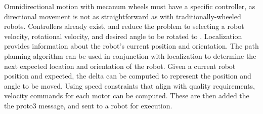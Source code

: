 Omnidirectional motion with mecanum wheels must have a specific controller, as directional movement is not as straightforward as with traditionally-wheeled robots. Controllers already exist, and reduce the problem to selecting a robot velocity, rotational velocity, and desired angle to be rotated to \cite{mecanumcontrol}. Localization provides information about the robot's current position and orientation. The path planning algorithm can be used in conjunction with localization to determine the next expected location and orientation of the robot. Given a current robot position and expected, the delta can be computed to represent the position and angle to be moved. Using speed constraints that align with quality requirements, velocity commands for each motor can be computed. These are then added the the proto3 message, and sent to a robot for execution.
